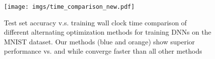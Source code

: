 \begin{figure}[ht]
\begin{center}
\centerline{
\texttt{[image: imgs/time\_comparison\_new.pdf]}
}
\caption{Test set accuracy v.s. training wall clock time comparison of different alternating optimization methods for training DNNs on the MNIST dataset. Our methods (blue and orange) show superior performance vs. \protect\cite{zeng2018global} and \protect\cite{wang2019global} while converge faster than all other methods}
\label{fig:time}
\end{center}
\end{figure}








